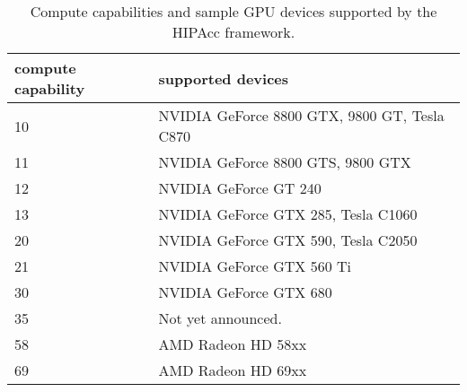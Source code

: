 \begin{table}
    \centering
    \begin{tabular}{ll}
\hline
compute capability\qquad& supported devices \\
\hline
10                      & NVIDIA GeForce 8800 GTX, 9800 GT, Tesla C870 \\
11                      & NVIDIA GeForce 8800 GTS, 9800 GTX \\
12                      & NVIDIA GeForce GT 240 \\
13                      & NVIDIA GeForce GTX 285, Tesla C1060 \\
20                      & NVIDIA GeForce GTX 590, Tesla C2050 \\
21                      & NVIDIA GeForce GTX 560 Ti \\
30                      & NVIDIA GeForce GTX 680 \\
35                      & Not yet announced. \\
\hline
58                      & AMD Radeon HD 58xx \\
69                      & AMD Radeon HD 69xx \\
\hline
    \end{tabular}
    \caption{Compute capabilities and sample GPU devices supported by the
    \ac{HIPAcc} framework.}\label{tab:cc}
\end{table}

